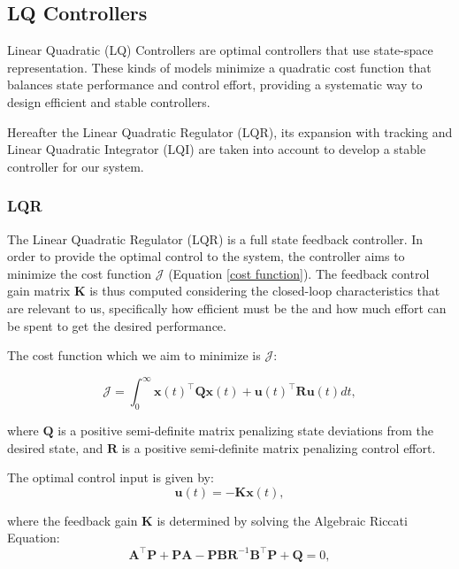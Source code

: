 \subsection{LQ Controllers}
\label{subsec:lq_controllers}
Linear Quadratic (LQ) Controllers are optimal controllers that use state-space representation. These kinds of models minimize a quadratic cost function that balances state performance and control effort, providing a systematic way to design efficient and stable controllers.

Hereafter the Linear Quadratic Regulator (LQR), its expansion with tracking and Linear Quadratic Integrator (LQI) are taken into account to develop a stable controller for our system.

\subsubsection{LQR}
\label{subsubsec:lqr}
The Linear Quadratic Regulator (LQR) is a full state feedback controller. In order to provide the optimal control to the system, the controller aims to minimize the cost function $\mathcal{J}$ (Equation \ref{cost function}). The feedback control gain matrix $\mathbf{K}$ is thus computed considering the closed-loop characteristics that are relevant to us, specifically how efficient must be the and how much effort can be spent to get the desired performance.

The cost function which we aim to minimize is $\mathcal{J}$:

\begin{equation}
    \mathcal{J} = \int_0^\infty \mathbf{x}(t)^\top \mathbf{Q} \mathbf{x}(t) + \mathbf{u}(t)^\top \mathbf{R} \mathbf{u}(t) dt,
    \label{cost function}
\end{equation}

where $\mathbf{Q}$ is a positive semi-definite matrix penalizing state deviations from the desired state, and $\mathbf{R}$ is a positive semi-definite matrix penalizing control effort.

The optimal control input is given by:
\begin{equation}
    \mathbf{u}(t) = -\mathbf{K} \mathbf{x}(t),
\end{equation}

where the feedback gain $\mathbf{K}$ is determined by solving the Algebraic Riccati Equation:
\begin{equation}
    \mathbf{A}^\top \mathbf{P} + \mathbf{P}\mathbf{A} - \mathbf{P}\mathbf{B}\mathbf{R}^{-1} \mathbf{B}^\top \mathbf{P} + \mathbf{Q} = 0,
\end{equation}

